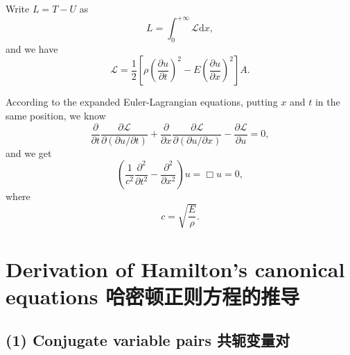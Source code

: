 Write \(L = T - U\) as
\[L = \int_{0}^{+\infty} \mathcal{L} \mathrm{d}x,\] and we have
\[\mathcal{L} = \frac{1}{2} \left[ \rho \left( \frac{\partial u}{\partial t} \right)^2 - E \left( \frac{\partial u}{\partial x} \right)^2 \right]A.\]

According to the expanded Euler-Lagrangian equations, putting \(x\) and
\(t\) in the same position, we know
\[\frac{\partial}{\partial t} \frac{\partial \mathcal{L}}{\partial (\partial u / \partial t)} + \frac{\partial}{\partial x} \frac{\partial \mathcal{L}}{\partial (\partial u / \partial x)} - \frac{\partial \mathcal{L}}{\partial u} = 0,\]
and we get
\[\left( \frac{1}{c^2} \frac{\partial^2}{\partial t^2} - \frac{\partial^2}{\partial x^2} \right) u = \Box u = 0,\]
where \[c = \sqrt{\frac{E}{\rho}}.\]

\section[Deriving Hamilton's canonical equations 推导哈密顿正则方程]{Derivation of Hamilton's canonical equations
哈密顿正则方程的推导}\label{derivation-of-hamiltons-canonical-equations-ux54c8ux5bc6ux987fux6b63ux5219ux65b9ux7a0bux7684ux63a8ux5bfc}

\subsection*{(1) Conjugate variable pairs
共轭变量对}\label{conjugate-variable-pairs-ux5171ux8f6dux53d8ux91cfux5bf9}

